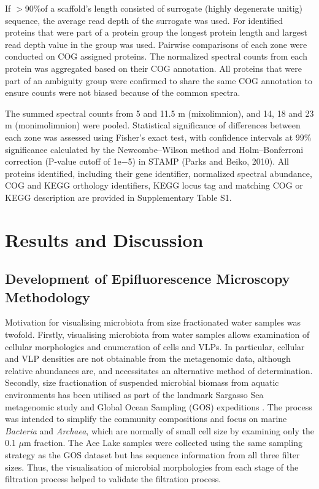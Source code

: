 If $>$90\%of a scaffold’s length consisted of surrogate (highly degenerate unitig) sequence, the average read depth of the surrogate was used. 
For identified proteins that were part of a protein group the longest protein length and largest read depth value in the group was used. 
Pairwise comparisons of each zone were conducted on COG assigned proteins. 
The normalized spectral counts from each protein was aggregated based on their COG annotation. 
All proteins that were part of an ambiguity group were confirmed to share the same COG annotation to ensure counts were not biased because of the common spectra.

The summed spectral counts from 5 and 11.5 m (mixolimnion), and 14, 18 and 23 m (monimolimnion) were pooled. 
Statistical significance of differences between each zone was assessed using Fisher’s exact test, with confidence intervals at 99\% significance calculated by the Newcombe–Wilson method and Holm–Bonferroni correction (P-value cutoff of 1e$-$5) in STAMP (Parks and Beiko, 2010). 
All proteins identified, including their gene identifier, normalized spectral abundance, COG and KEGG orthology identifiers, KEGG locus tag and matching COG or KEGG description are provided in Supplementary Table S1.




\section{Results and Discussion}

\subsection[Epifluorescence Microscopy Methodology]{Development of Epifluorescence Microscopy Methodology}
Motivation for visualising microbiota from size fractionated water samples was twofold. 
Firstly, visualising microbiota from water samples allows examination of cellular morphologies and enumeration of cells and VLPs.
In particular, cellular and VLP densities are not obtainable from the metagenomic data, although relative abundances are, and necessitates an alternative method of determination.
Secondly, size fractionation of suspended microbial biomass from aquatic environments has been utilised as part of the landmark Sargasso Sea metagenomic study \cite{Venter2004} and Global Ocean Sampling (GOS) expeditions \cite{Rusch2007}.
The process was intended to simplify the community compositions and focus on marine \emph{Bacteria} and \emph{Archaea}, which are normally of small cell size by examining only the 0.1 $\mu$m fraction.
The Ace Lake samples were collected using the same sampling strategy as the GOS dataset but has sequence information from all three filter sizes. 
Thus, the visualisation of microbial morphologies from each stage of the filtration process helped to validate the filtration process.

